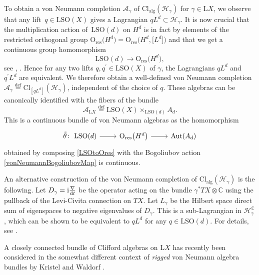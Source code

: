\documentclass[10pt,a4paper]{amsart}
\numberwithin{equation}{section}
\newcommand{\C}{\mathbb{C}}
\newcommand{\A}{\mathcal{A}}
\newcommand{\Cl}{\mathrm{Cl}}
\newcommand{\SO}{\mathrm{SO}}
\newcommand{\res}{\mathrm{res}}
\newcommand{\Aut}{\mathrm{Aut}}
\renewcommand{\O}{\mathrm{O}}
\renewcommand{\L}{\mathrm{L}}
\newcommand{\defeq}{\stackrel{\mathrm{def}}{=}}
\begin{document}
To obtain a von Neumann completion $\A_\gamma$ of $\Cl_{\mathrm{alg}}(\mathcal{H}_\gamma)$ for $\gamma \in \L X$, we observe that any lift~${q \in \L \SO(X)}$ gives a Lagrangian $q L^d \subset \mathcal{H}_\gamma$.
It is now crucial that the multiplication action of~$\L\SO(d)$ on $H^d$ is in fact by elements of the restricted orthogonal group $\O_{\res}\big(H^d\big) = \O_{\res}\big(H^d, \big[L^d\big]\big)$ and that we get a continuous group homomorphism
\begin{equation} \label{LSOtoOres}
 \L\SO(d) \longrightarrow \O_{\res}\big(H^d\big),
\end{equation}
see \cite[Proposition~6.3.1]{PressleySegal}, \cite[Proposition~3.23]{KristelWaldorf1}.
Hence for any two lifts $q, q^\prime \in \L \SO(X)$ of $\gamma$, the Lagrangians $q L^d$ and $q^\prime L^d$ are equivalent.
We therefore obtain a well-defined von Neumann completion $\A_\gamma \defeq \Cl_{[q L^d]}(\mathcal{H}_\gamma)$, independent of the choice of $q$.
These algebras can be canonically identified with the fibers of the bundle
\begin{equation} \label{vNBundleAsAssociatedBundle}
 \A_{\L X} \defeq \L \SO(X) \times_{\L\SO(d)} A_d.
\end{equation}
This is a continuous bundle of von Neumann algebras as the homomorphism
\begin{equation} \label{ThetaTilde}
\begin{tikzcd}
\tilde{\theta}\colon \ \L \SO(d) \ar[r] & \O_{\res}\big(H^d\big) \ar[r] & \Aut(A_d)
\end{tikzcd}
\end{equation}
obtained by composing \eqref{LSOtoOres} with the Bogoliubov action \eqref{vonNeumannBogoliubovMap} is continuous.

\begin{Remark}
An alternative construction of the von Neumann completion of $\Cl_{\mathrm{alg}}(\mathcal{H}_\gamma)$ is the following.
Let $D_\gamma = \mathrm{i}\frac{\nabla}{{\rm d}t}$ be the operator acting on the bundle $\gamma^*T X \otimes \C$ using the pullback of the Levi-Civita connection on $TX$.
Let $L_\gamma$ be the Hilbert space direct sum of eigenspaces to negative eigenvalues of $D_\gamma$.
This is a sub-Lagrangian in $\mathcal{H}_\gamma^\C$, which can be shown to be equivalent to $q L^d$ for any $q \in \L\SO(d)$.
For details, see \cite[Section~1.3]{LudewigSpinorBundle}.
\end{Remark}

\begin{Remark}
A closely connected bundle of Clifford algebras on $\L X$ has recently been considered in the somewhat different context of \emph{rigged} von Neumann algebra bundles by Kristel and Waldorf \cite{KristelWaldorf2}.
\end{Remark}
\end{document}
